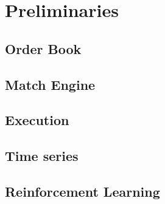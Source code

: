 \chapter{Preliminaries}

\section{Order Book}

\section{Match Engine}

\section{Execution}

\section{Time series}

\section{Reinforcement Learning}